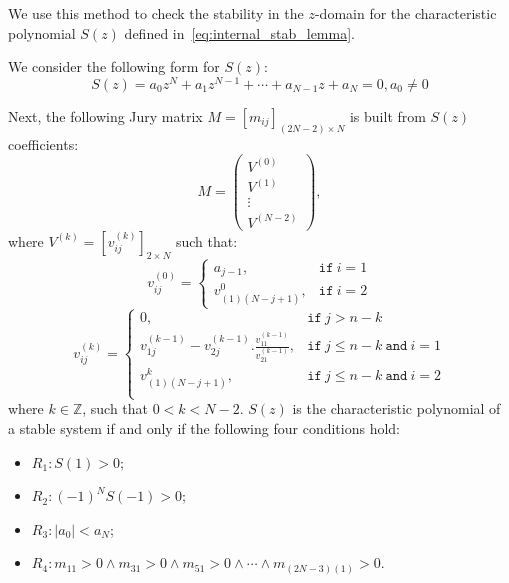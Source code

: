 \documentclass{sig-alternate-05-2015}
\newcommand{\red}[1]{{\color{red}#1}}
\begin{document}
We use this method to check the stability in the $z$-domain for the
characteristic polynomial $S(z)$ defined
in~\eqref{eq:internal_stab_lemma}.

%
We consider the following form for $S(z)$:
%
$$
S(z) = a_0z^N+a_1z^{N-1}+\cdots+a_{N-1}z+a_N=0, a_0\neq0
$$
%


Next, the following Jury matrix
$M = [m_{ij}]_{(2N−2)\times N}$ is built from $S(z)$ coefficients:
%
$$
M=\left( 
\begin{array}{c}
V^{(0)}\\
V^{(1)}\\
\vdots\\
V^{(N-2)}
\end{array}
\right), 
$$
%
where $V^{(k)} = [v^{(k)}_{ij} ]_{2\times N}$ such that:
%
$$
v_{ij}^{(0)}=\left\{
\begin{array}{ll}
a_{j-1}, & \texttt{if}~i=1\\
v_{(1)(N-j+1)}^{0},&\texttt{if}~i=2
\end{array}
\right.
$$
%
$$
v_{ij}^{(k)}=\left\{
\begin{array}{ll}
0,&\texttt{if}~j>n-k\\
v_{1j}^{(k-1)}-v_{2j}^{(k-1)} . \frac{v_{11}^{(k-1)}}{v_{21}^{(k-1)}}, & \texttt{if}~j\leq n-k ~\texttt{and}~i=1\\
v_{(1)(N-j+1)}^{k},& \texttt{if}~j\leq n-k ~\texttt{and}~i=2\\
\end{array}
\right.
$$
%
where $k \in \mathbb{Z}$, such that $0 < k < N - 2$. 
$S(z)$ is the
characteristic polynomial of a stable system if and only if the following four conditions hold:
\begin{itemize}
\item $R_1: S(1) > 0$;
\item $R_2: (−1)^N S(−1) > 0$;
\item $R_3: |a_0| < a_N$;
\item $R_4: m_{11} > 0 \wedge m_{31}>0 \wedge m_{51}>0 \wedge \cdots \wedge m_{(2N{-}3)(1)}>0$.
\end{itemize}
\end{document}
